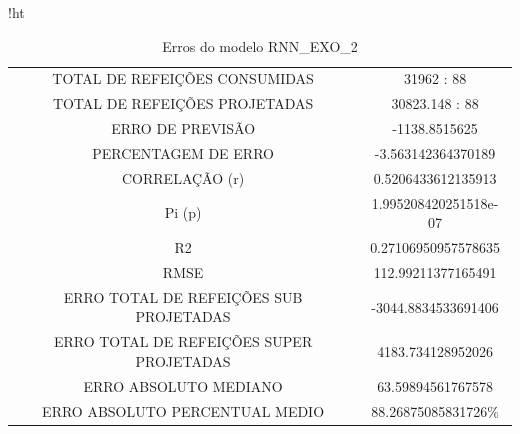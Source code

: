\documentclass[	12pt, Times, openright, twoside, a4paper, english, brazil]{abntex2}
\begin{document}
                \begin{figure}[H]
                \end{figure}
               
               
                \begin{table}{!ht}
                \centering
                \caption{Erros do modelo  RNN\_EXO\_2 } 
                    \begin{tabular}{|c|c|}
                    \rowcolor{gray!50}
                    \hline
                \multicolumn{2}{c}{RNN\_EXO\_2:} \\ \hline
                TOTAL DE REFEIÇÕES CONSUMIDAS & 31962 : 88 \\
                TOTAL DE REFEIÇÕES PROJETADAS & 30823.148 : 88 \\
                ERRO DE PREVISÃO & -1138.8515625 \\
                PERCENTAGEM DE ERRO &  -3.563142364370189 \\
                CORRELAÇÃO (r)& 0.5206433612135913\\ Pi (p) & 1.995208420251518e-07\\
                R2 & 0.27106950957578635\\
                RMSE & 112.99211377165491\\
                ERRO TOTAL DE REFEIÇÕES SUB PROJETADAS & -3044.8834533691406\\
                ERRO TOTAL DE REFEIÇÕES SUPER PROJETADAS & 4183.734128952026\\
                ERRO ABSOLUTO MEDIANO & 63.59894561767578\\
                ERRO ABSOLUTO PERCENTUAL MEDIO & 88.26875085831726\% \\ \hline \end{tabular}\end{table}
                
\end{document}
